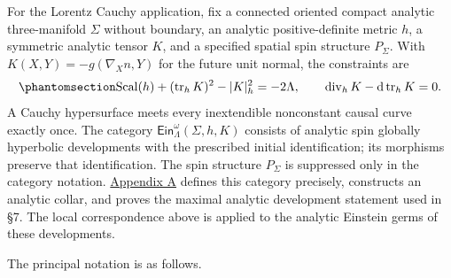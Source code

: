 \documentclass[
  english,
  11pt,
  reqno]{amsart}
\begin{document}
For the Lorentz Cauchy application, fix a connected oriented compact
analytic three-manifold \(\Sigma\) without boundary, an analytic
positive-definite metric \(h\), a symmetric analytic tensor \(K\), and a
specified spatial spin structure \(P_\Sigma\). With
\(K(X,Y)=-g(\nabla_Xn,Y)\) for the future unit normal, the constraints
are
\begin{equation}\protect\phantomsection\label{eq:ordinary-analytic-constraints-v08}{
\operatorname{Scal}(h)+(\operatorname{tr}_hK)^2-|K|_h^2=-2\Lambda,
\qquad
\operatorname{div}_hK-\mathrm d\operatorname{tr}_hK=0.
}\end{equation} A Cauchy hypersurface meets every inextendible
nonconstant causal curve exactly once. The category
\(\mathsf{Ein}^{\omega}_\Lambda(\Sigma,h,K)\) consists of analytic spin
globally hyperbolic developments with the prescribed initial
identification; its morphisms preserve that identification. The spin
structure \(P_\Sigma\) is suppressed only in the category notation.
\hyperref[sec:analytic-cauchy-appendix-v08]{Appendix A} defines this
category precisely, constructs an analytic collar, and proves the
maximal analytic development statement used in §7. The local
correspondence above is applied to the analytic Einstein germs of these
developments.

The principal notation is as follows.
\end{document}
